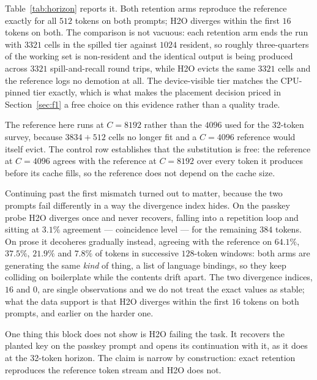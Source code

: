 \documentclass[manuscript,anonymous,review]{acmart}
\begin{document}
Table~\ref{tab:horizon} reports it. Both retention arms reproduce the
reference exactly for all $512$ tokens on both prompts; H2O diverges
within the first $16$ tokens on both. The comparison is not vacuous:
each retention arm ends the run with $3321$ cells in the spilled tier
against $1024$ resident, so roughly three-quarters of the working set
is non-resident and the identical output is being produced across
$3321$ spill-and-recall round trips, while H2O evicts the same $3321$
cells and the reference logs no demotion at all. The device-visible
tier matches the CPU-pinned tier exactly, which is what makes the
placement decision priced in Section~\ref{sec:f1} a free choice on
this evidence rather than a quality trade.

The reference here runs at $C = 8192$ rather than the $4096$ used for
the 32-token survey, because $3834 + 512$ cells no longer fit and a
$C = 4096$ reference would itself evict. The control row establishes
that the substitution is free: the reference at $C = 4096$ agrees with
the reference at $C = 8192$ over every token it produces before its
cache fills, so the reference does not depend on the cache size.

Continuing past the first mismatch turned out to matter, because the
two prompts fail differently in a way the divergence index hides. On
the passkey probe H2O diverges once and never recovers, falling into a
repetition loop and sitting at $3.1\%$ agreement --- coincidence level
--- for the remaining $384$ tokens. On prose it decoheres gradually
instead, agreeing with the reference on $64.1\%$, $37.5\%$, $21.9\%$
and $7.8\%$ of tokens in successive $128$-token windows: both arms are
generating the same \emph{kind} of thing, a list of language bindings,
so they keep colliding on boilerplate while the contents drift apart.
The two divergence indices, $16$ and $0$, are single observations and
we do not treat the exact values as stable; what the data support is
that H2O diverges within the first $16$ tokens on both prompts, and
earlier on the harder one.

One thing this block does not show is H2O failing the task. It
recovers the planted key on the passkey prompt and opens its
continuation with it, as it does at the 32-token horizon. The claim is
narrow by construction: exact retention reproduces the reference token
stream and H2O does not.
\end{document}
